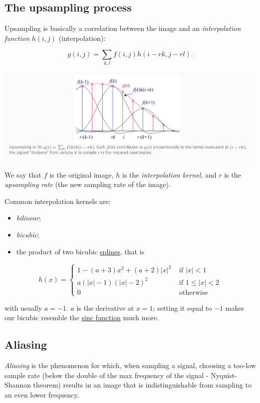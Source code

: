 \documentclass[10pt]{report}
\begin{document}
\subsection{The upsampling process}
\label{sec:org3c568d0}
Upsampling is basically a correlation between the image and an
\emph{interpolation function} \(h(i, j)\) (interpolation):

\[g(i, j)= \sum_{k, l} f(i, j) h(i - rk, j - rl).\]

\begin{center}
\includegraphics[width=.9\linewidth]{./pics/proc/upsampling.jpg}
\end{center}

We say that \(f\) is the original image, \(h\) is the \emph{interpolation
kernel}, and \(r\) is the \emph{upsampling rate} (the new sampling rate of
the image).

Common interpolation kernels are:

\begin{itemize}
\item \emph{bilinear};
\item \emph{bicubic};
\item the product of two bicubic \href{https://en.wikipedia.org/wiki/Spline\_(mathematics)}{splines}, that is
\end{itemize}

\[h(x) = \left\{ \begin{array}{ll} 1 - (a + 3)x^2 + (a + 2)|x|^3 & \mbox{ if } |x| < 1\\ a(|x| - 1)(|x| - 2)^2 & \mbox{ if } 1 \leq |x| < 2\\ 0 & \mbox{ otherwise } \end{array} \right. \]

with usually \(a = -1\). \(a\) is the derivative at \(x = 1\); setting
it equal to \(-1\) makes our bicubic resemble the
\href{https://en.wikipedia.org/wiki/Sinc\_function}{sinc function} much
more.

\subsection{Aliasing}
\label{aliasing}
\emph{Aliasing} is the phenomenon for which, when sampling a signal, choosing
a too-low sample rate (below the double of the max frequency of the
signal - Nyquist-Shannon theorem) results in an image that is
indistinguishable from sampling to an even lower frequency.
\end{document}

